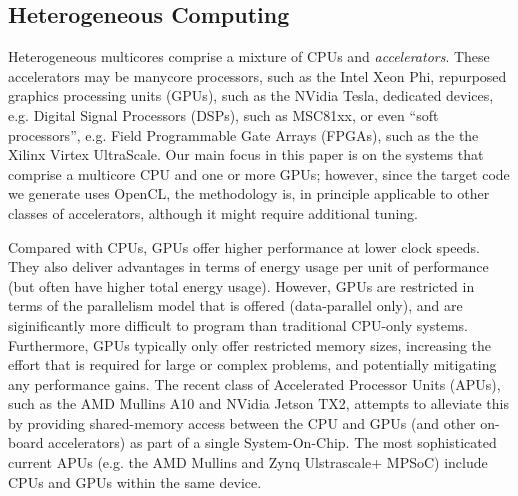 \documentclass[final]{jfp1}
\begin{document}
\subsection{Heterogeneous Computing}

Heterogeneous multicores comprise a mixture of CPUs and \emph{accelerators}.
These accelerators may be manycore processors, such as the Intel Xeon Phi,
repurposed graphics processing units (GPUs), such as the NVidia Tesla,
dedicated devices, e.g. Digital Signal Processors (DSPs), such as MSC81xx,
or even ``soft processors'', e.g. Field Programmable Gate Arrays (FPGAs),
such as the the Xilinx Virtex UltraScale. Our main focus in this paper is
on the systems that comprise a multicore CPU and one or more GPUs; however,
since the target code we generate uses OpenCL, the methodology is, in principle
applicable to other classes of accelerators, although it might require additional tuning.

Compared with CPUs, GPUs offer higher performance at
lower clock speeds.  They also deliver advantages in terms of energy usage
per unit of performance (but often have higher total energy usage).
However, GPUs are restricted in terms of the parallelism model that is
offered (data-parallel only), and are siginificantly more difficult
to program than traditional CPU-only systems.  Furthermore, GPUs 
typically only offer restricted memory sizes, increasing the effort that
is required for large or complex problems, and potentially mitigating any
performance gains.  The recent class of Accelerated Processor Units (APUs),
such as the AMD Mullins A10 and NVidia Jetson TX2, 
attempts to alleviate this by providing shared-memory
access between the CPU and GPUs (and other on-board accelerators) as
part of a single System-On-Chip.
The most sophisticated current APUs (e.g. the AMD Mullins and Zynq Ulstrascale+ MPSoC) include CPUs and GPUs within
the same device.
\end{document}
